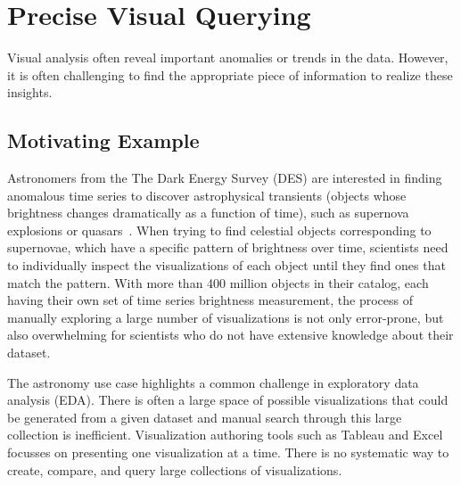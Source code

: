 \section{Precise Visual Querying\label{sec:precise}}
Visual analysis often reveal important anomalies or trends in the data\cite{Morton2014}. However, it is often challenging to find the appropriate piece of information to realize these insights.

\subsection{Motivating Example}
Astronomers from the The Dark Energy Survey (DES) are interested in finding anomalous time series to discover astrophysical transients (objects whose brightness changes dramatically as a function of time), such as supernova explosions or quasars~\cite{Drlica-Wagner2017}. When trying to find celestial objects corresponding to supernovae, which have a specific pattern of brightness over time, scientists need to individually inspect the visualizations of each object until they find ones that match the pattern. With more than 400 million objects in their catalog, each having their own set of time series brightness measurement, the process of manually exploring a large number of visualizations is not only error-prone, but also overwhelming for scientists who do not have extensive knowledge about their dataset.  
\par The astronomy use case highlights a common challenge in exploratory data analysis (EDA). There is often a large space of possible visualizations that could be generated from a given dataset and manual search through this large collection is inefficient. Visualization authoring tools such as Tableau and Excel focusses on presenting one visualization at a time. There is no systematic way to create, compare, and query large collections of visualizations. 

